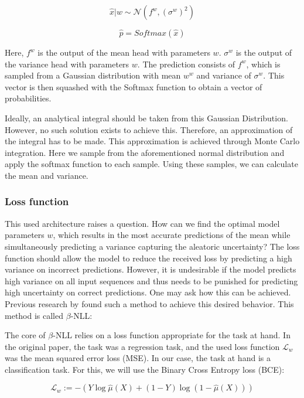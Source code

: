 \begin{equation}
    \hat{x}|w \sim \mathcal{N}(f^w, (\sigma^w)^2)
\end{equation}

\begin{equation}
    \hat{p} = Softmax(\hat{x})
\end{equation}

Here, $f^w$ is the output of the mean head with parameters $w$. $\sigma^w$ is the output of the variance head with parameters $w$. The prediction consists of $f^w$, which is sampled from a Gaussian distribution with mean $w^w$ and variance of $\sigma^w$. This vector is then squashed with the Softmax function to obtain a vector of probabilities.

Ideally, an analytical integral should be taken from this Gaussian Distribution. However, no such solution exists to achieve this. Therefore, an approximation of the integral has to be made. This approximation is achieved through Monte Carlo integration. Here we sample from the aforementioned normal distribution and apply the softmax function to each sample. Using these samples, we can calculate the mean and variance.


\subsubsection{Loss function}

This used architecture raises a question. How can we find the optimal model parameters $w$, which results in the most accurate predictions of the mean while simultaneously predicting a variance capturing the aleatoric uncertainty? The loss function should allow the model to reduce the received loss by predicting a high variance on incorrect predictions. However, it is undesirable if the model predicts high variance on all input sequences and thus needs to be punished for predicting high uncertainty on correct predictions. One may ask how this can be achieved. Previous research by \cite{seitzer2022pitfalls} found such a method to achieve this desired behavior. This method is called $\beta$-NLL:

The core of $\beta$-NLL relies on a loss function appropriate for the task at hand. In the original paper, the task was a regression task, and the used loss function $\mathcal{L}_w$ was the mean squared error loss (MSE). In our case, the task at hand is a classification task. For this, we will use the Binary Cross Entropy loss (BCE):

\begin{equation}
    \mathcal{L}_w := - ( Y \log \hat{\mu}(X) + (1 - Y) \log (1 - \hat{\mu}(X)) )
\end{equation}

